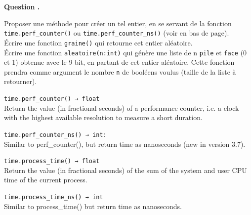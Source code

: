 \documentclass[t,11pt]{article}
\newcounter{cexo}
\newenvironment{qexo}{
\refstepcounter{cexo}
\vspace{3 pt}
\noindent
\begin{minipage}[t]{0.15\textwidth}
\textbf{\noindent Question \arabic{cexo}. }
\end{minipage}\noindent
\begin{minipage}[t]{0.85\textwidth}}{\vspace{3 pt}
\end{minipage}}%
\begin{document}
\begin{qexo}
Proposer une méthode pour créer un tel entier, en se servant de la fonction \texttt{time.perf\_counter()} ou \texttt{time.perf\_counter\_ns()} (voir en bas de page).\\
\'Ecrire une fonction \texttt{graine()} qui retourne cet entier aléatoire.\\
\'Ecrire une fonction \texttt{aleatoire(n:int)} qui génère une liste de n \texttt{pile} et \texttt{face} (0 et 1) obtenue avec le 9 bit, en partant de cet entier aléatoire. Cette fonction prendra comme argument le nombre \texttt{n} de booléens voulus (taille de la liste à retourner).
\end{qexo}


\vspace{0.5cm}
\texttt{time.perf\_counter() → float}\\
Return the value (in fractional seconds) of a performance counter, i.e. a clock with the highest available resolution to measure a short duration.

\texttt{time.perf\_counter\_ns() → int:}\\
Similar to perf\_counter(), but return time as nanoseconds (new in version 3.7).

\texttt{time.process\_time() → float}\\
Return the value (in fractional seconds) of the sum of the system and user CPU time of the current process.

\texttt{time.process\_time\_ns() → int}\\
Similar to process\_time() but return time as nanoseconds.
\end{document}
